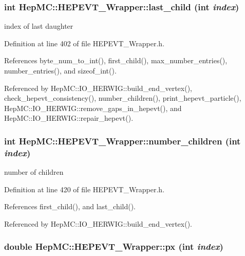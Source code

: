 \subsubsection{\setlength{\rightskip}{0pt plus 5cm}int Hep\-MC::HEPEVT\_\-Wrapper::last\_\-child (int {\em index})\hspace{0.3cm}{\tt  [inline, static]}}\label{classHepMC_1_1HEPEVT__Wrapper_143ddd0d4b55c3d47409c230979f25c5}


index of last daughter 



Definition at line 402 of file HEPEVT\_\-Wrapper.h.

References byte\_\-num\_\-to\_\-int(), first\_\-child(), max\_\-number\_\-entries(), number\_\-entries(), and sizeof\_\-int().

Referenced by Hep\-MC::IO\_\-HERWIG::build\_\-end\_\-vertex(), check\_\-hepevt\_\-consistency(), number\_\-children(), print\_\-hepevt\_\-particle(), Hep\-MC::IO\_\-HERWIG::remove\_\-gaps\_\-in\_\-hepevt(), and Hep\-MC::IO\_\-HERWIG::repair\_\-hepevt().
\subsubsection{\setlength{\rightskip}{0pt plus 5cm}int Hep\-MC::HEPEVT\_\-Wrapper::number\_\-children (int {\em index})\hspace{0.3cm}{\tt  [inline, static]}}\label{classHepMC_1_1HEPEVT__Wrapper_4e1700f9a9adf4b078d9eae99d069a41}


number of children 



Definition at line 420 of file HEPEVT\_\-Wrapper.h.

References first\_\-child(), and last\_\-child().

Referenced by Hep\-MC::IO\_\-HERWIG::build\_\-end\_\-vertex().
\subsubsection{\setlength{\rightskip}{0pt plus 5cm}double Hep\-MC::HEPEVT\_\-Wrapper::px (int {\em index})\hspace{0.3cm}{\tt  [inline, static]}}\label{classHepMC_1_1HEPEVT__Wrapper_930a8cc2c98573500db7ad5b41853fb5}


